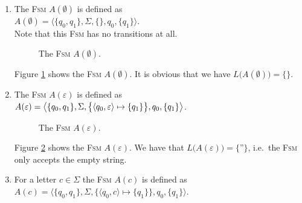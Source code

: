 \begin{enumerate}
\item The \textsc{Fsm} $A(\emptyset)$ is defined as
      \\[0.2cm]
      \hspace*{1.3cm}
      $A(\emptyset) = \bigl\langle \{ q_0, q_1 \}, \Sigma, \{\}, q_0, \{ q_1 \} \bigr\rangle$.
      \\[0.2cm]
      Note that this \textsc{Fsm} has no transitions at all.

      \begin{figure}[!ht]
        \centering
      \caption{The \textsc{Fsm} $A(\emptyset)$.}
      \label{fig:aLeer.eps}
      \end{figure}
      Figure \ref{fig:aLeer.eps} shows the \textsc{Fsm} $A(\emptyset)$. It is obvious that we have
      $L\bigl(A(\emptyset)\bigr) = \{\}$. 
\item The \textsc{Fsm} $A(\varepsilon)$ is defined as
      \\[0.2cm]
      \hspace*{1.3cm}
      $A(\varepsilon) = \bigl\langle \{ q_0, q_1 \}, \Sigma, 
                          \bigl\{ \pair(q_0, \varepsilon) \mapsto \{q_1\} \bigr\}, q_0, \{ q_1 \} \bigr\rangle$.


      \begin{figure}[!ht]
        \centering
      \caption{The \textsc{Fsm} $A(\varepsilon)$.}
      \label{fig:aEpsilon.eps}
      \end{figure}
      Figure \ref{fig:aEpsilon.eps} shows the \textsc{Fsm} $A(\varepsilon)$.
      We have that $L\bigl(A(\varepsilon)\bigr) = \{\texttt{''}\}$, i.e.~the \textsc{Fsm} only accepts the empty string. 
\item For a letter $c \in \Sigma$ the \textsc{Fsm} $A(c)$ is defined as 
      \\[0.2cm]
      \hspace*{1.3cm}
      $A(c) = \bigl\langle \{ q_0, q_1 \}, \Sigma, 
                                \bigl\{ \langle q_0, c \rangle \mapsto \{q_1\}\bigr\}, q_0, \{ q_1 \} \bigr\rangle$.


\end{enumerate}
